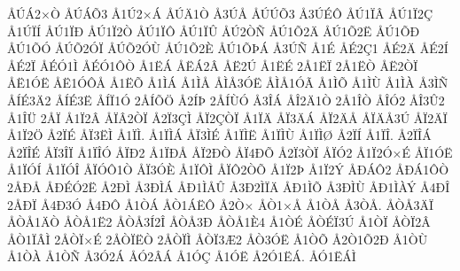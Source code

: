 {^^c5^^da^^c12^^d7^^d2
^^c5^^da^^c1^^d53
^^c51^^da2^^d7^^c1
^^c5^^da^^c41^^d2
^^c53^^da^^c5
^^c5^^da^^da^^d53
^^c53^^da^^c9^^d4
^^c5^^da1^^cf^^c2
^^c5^^da1^^cf2^^c7
^^c51^^da^^cf^^cd
^^c5^^da1^^cf^^d0
^^c5^^da1^^cf2^^d2
^^c5^^da1^^cf^^d4
^^c5^^da1^^cf^^db
^^c5^^da2^^d2^^d1
^^c5^^da1^^d52^^c4
^^c5^^da1^^d52^^cb
^^c5^^da1^^d5^^d0
^^c5^^da1^^d5^^d3
^^c5^^da^^d52^^d3^^cf
^^c5^^da^^d52^^d3^^d9
^^c5^^da1^^d52^^c8
^^c5^^da1^^d5^^de^^c1
^^c53^^da^^d1
^^c51^^c9
^^c5^^c92^^c71
^^c5^^c92^^c4
^^c5^^c92^^cd
^^c5^^c92^^cf
^^c5^^c9^^d31^^cc
^^c5^^c9^^d31^^d4^^d2
^^c51^^cb^^c1
^^c5^^cb^^c12^^c2
^^c5^^cb2^^da
^^c51^^cb^^c9
2^^c51^^cb^^cf
2^^c51^^cb^^d2
^^c5^^cb2^^d2^^cf
^^c5^^cb1^^d3^^cb
^^c5^^cb1^^d3^^d4^^c5
^^c51^^cb^^d5
^^c51^^cc^^c1
^^c51^^cc^^c5
^^c5^^cc^^c53^^d3^^cb
^^c5^^cc^^c51^^d3^^c3
^^c51^^cc^^d5
^^c51^^cc^^d9
^^c51^^cc^^c0
^^c53^^cc^^d1
^^c5^^cd^^c93^^c42
^^c5^^cd^^c93^^cb
^^c5^^cd^^cf1^^d3
2^^c5^^cd^^d5^^d6
^^c52^^cd^^de
2^^c5^^cd^^d9^^d3
^^c53^^ce^^c1
^^c5^^ce2^^c41^^d2
2^^c51^^ce^^d2
^^c5^^ce^^d32
^^c5^^ce3^^db2
^^c51^^ce^^dc
2^^c5^^cf
^^c51^^cf2^^c2
^^c5^^cf^^c22^^d2^^cf
^^c52^^cf3^^c7^^cc
^^c5^^cf2^^c7^^d2^^cf
^^c51^^cf^^c4
^^c5^^cf3^^c4^^c1
^^c5^^cf2^^c4^^c5
^^c5^^cf^^c4^^c53^^da
^^c5^^cf2^^c4^^cf
^^c51^^cf2^^d6
^^c52^^cf^^c9
^^c5^^cf3^^cb^^cc
^^c51^^cf^^cc.
^^c51^^cf^^cc^^c1
^^c5^^cf3^^cc^^c9
^^c51^^cf^^cc^^cb
^^c51^^cf^^cc^^d9
^^c51^^cf^^cc^^d8
^^c52^^cf^^cd
^^c51^^cf^^ce.
^^c52^^cf^^ce^^c1
^^c52^^cf^^ce^^c9
^^c5^^cf3^^ce^^cf
^^c51^^cf^^ce^^d3
^^c5^^cf^^d02
^^c51^^cf^^d0^^c5
^^c5^^cf2^^d0^^d2
^^c5^^cf4^^d0^^d5
^^c52^^cf3^^d2^^cf
^^c5^^cf^^d32
^^c51^^cf2^^d3^^d7^^c9
^^c5^^cf1^^d3^^cb
^^c51^^cf^^d3^^cd
^^c51^^cf^^d3^^ce
^^c5^^cf^^d3^^d41^^d2
^^c5^^cf3^^d3^^c8
^^c51^^cf^^d4^^cc
^^c5^^cf^^d42^^d2^^d5
^^c51^^cf2^^de
^^c51^^cf2^^dd
^^c5^^d0^^c1^^d42
^^c5^^d0^^c11^^d4^^d2
2^^c5^^d0^^c5
^^c5^^d0^^c9^^d32^^cb
^^c52^^d0^^cc
^^c53^^d0^^cc^^c1
^^c5^^d01^^cc^^c5^^db
^^c53^^d02^^cc^^cf^^c4
^^c5^^d01^^cc^^d5
^^c53^^d0^^cc^^d9
^^c5^^d01^^cc^^c0^^dd
^^c54^^d0^^ce
2^^c5^^d0^^cf
^^c54^^d03^^d3
^^c54^^d0^^d4
^^c51^^d2^^c1
^^c5^^d21^^c1^^cb^^d4
^^c52^^d2^^d7
^^c5^^d21^^d7^^c5
^^c51^^d2^^c5
^^c53^^d2^^c5.
^^c5^^d2^^c53^^c4^^cf
^^c5^^d2^^c51^^c4^^d2
^^c5^^d2^^c51^^cb2
^^c5^^d2^^c53^^cd2^^ce
^^c5^^d2^^c53^^d0
^^c5^^d2^^c51^^c84
^^c51^^d2^^c9
^^c5^^d2^^c9^^cf3^^da
^^c51^^d2^^cf
^^c5^^d2^^cf2^^c2
^^c5^^d21^^cf^^c2^^cc
2^^c5^^d2^^cf^^d7^^c9
2^^c5^^d2^^cf^^cb^^d2
2^^c5^^d2^^cf^^cc
^^c5^^d2^^cf3^^c62
^^c5^^d23^^d3^^cb
^^c51^^d2^^d5
^^c52^^d21^^d52^^d0
^^c51^^d2^^d9
^^c51^^d2^^c0
^^c51^^d2^^d1
^^c53^^d32^^c1
^^c5^^d32^^c2^^c1
^^c51^^d3^^c7
^^c51^^d3^^cb
^^c52^^d31^^cb^^c1.
^^c5^^d31^^cb^^c1^^cc
}
